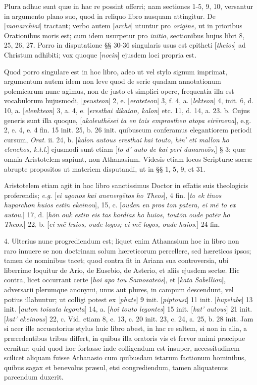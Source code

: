 Plura
adhuc sunt quæ in hac re possint offerri; nam sectiones 1-5, 9, 10,
versantur in argumento plano suo, quod in reliquo libro nusquam
attingitur. De [\emph{monarchiai}] tractant; verbo autem [\emph{arch\={e}}]
utuntur pro \emph{origine}, ut in prioribus Orationibus moris est; cum
idem usurpetur pro \emph{initio}, sectionibus hujus libri 8, 25, 26,
27. Porro in disputatione §§ 30-36 singularis usus est epitheti [\emph{theios}]
ad Christum adhibiti; vox quoque [\emph{noein}] ejusdem loci propria
est.

Quod
porro singulare est in hoc libro, adeo ut vel stylo signum imprimat,
argumentum autem idem non leve quod de serie quadam annotationum
polemicarum nunc agimus, non de justo et simplici opere, frequentia
illa est vocabulorum hujusmodi, [\emph{peusteon}] 2, e. [\emph{er\={o}t\={e}teon}]
3, f. 4, a. [\emph{lekteon}] 4, init. 6, d. 10, a. [\emph{elenkteon}]
3, a. 4, e. [\emph{eresthai dikaion, kalon}] etc. 11, d. 14, a. 23. b.
Cujus generis sunt illa quoque, [\emph{akoleuth\={e}sei ta en tois
emprosthen atopa eir\={e}mena}], e.g. 2, e. 4, e. 4 fin. 15
init. 25, b. 26 init. quibuscum conferamus
elegantiorem periodi cursum, \emph{Orat}. ii. 24, b. [\emph{kalon
autous eresthai kai touto, hin' eti mallon ho elenchos, k.t.l}.]
ejusmodi sunt etiam [\emph{to d' auto de kai peri duname\={o}s,}]
§ 3; quæ omnia Aristotelem sapiunt, non Athanasium. Videsis etiam
locos Scripturæ sacræ abrupte propositos ut materiem disputandi, ut
in §§ 1, 5, 9, et 31.

Aristotelem etiam agit in hoc
libro sanctissimus Doctor in effatis suis theologicis proferendis; \emph{e.g}.
[\emph{ei agonos kai anenerg\={e}tos ho Theos}], 4 fin. [\emph{to ek
tinos huparchon huios estin ekeinou}], 15, c. [\emph{ouden en pros ton
patera, ei m\={e} to ex autou}.] 17, d. [\emph{h\={o}n ouk estin
eis tas kardias ho huios, tout\={o}n oude pat\={e}r ho Theos}.]
22, b. [\emph{ei m\={e} huios, oude logos; ei m\={e} logos, oude
huios}.] 24 fin.

4.
Ulterius nunc progrediendum est; liquet enim Athanasium hoc in libro
non raro innuere se non doctrinam solum hæreticorum percellere, sed hæreticos
ipsos; tamen de nominibus tacet; quod contra fit in Ariana sua
controversia, ubi liberrime loquitur de Ario, de Eusebio, de Asterio,
et aliis ejusdem sectæ. Hic contra, licet occurrant certe [\emph{hoi apo
tou Samosate\={o}s}], et [\emph{kata Sabellion}], adversarii
plerumque anonymi, unus aut plures, in campum descendunt, vel potius
illabuntur; ut colligi potest ex [\emph{phate}] 9 init. [\emph{piptousi}]
11 init. [\emph{hupelabe}] 13 init. [\emph{auton toiauta legonta}] 14,
a. [\emph{hoi touto legontes}] 15 init. [\emph{kat' autous}] 21 init.
[\emph{kat' ekeinous}] 22, c. Vid. etiam 8, c. 13, c. 20 init. 23, c.
24, a. 25, b. 28 init. Jam si acer ille accusatorius stylus huic libro
abest, in hac re saltem, si non in alia, a præcedentibus tribus
differt, in quibus illa oratoris vis et fervor animi præcipue
cernitur; quid quod hoc fortasse inde colligendum est insuper,
necessitudinem scilicet aliquam fuisse Athanasio cum quibusdam
istarum factionum hominibus, quibus sagax et benevolus præsul, etsi
congrediendum, tamen aliquatenus parcendum duxerit.

